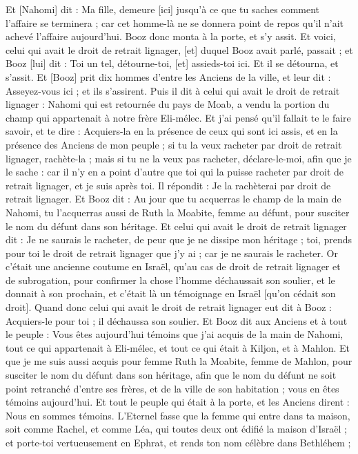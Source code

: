 \begin{multicols}{2}
Et [Nahomi] dit : Ma fille, demeure [ici] jusqu'à ce que tu saches comment l'affaire se terminera ; car cet homme-là ne se donnera point de repos qu'il n'ait achevé l'affaire aujourd'hui.
\VerseOne{}Booz donc monta à la porte, et s'y assit. Et voici, celui qui avait le droit de retrait lignager, [et] duquel Booz avait parlé, passait ; et Booz [lui] dit : Toi un tel, détourne-toi, [et] assieds-toi ici. Et il se détourna, et s'assit.
Et [Booz] prit dix hommes d'entre les Anciens de la ville, et leur dit : Asseyez-vous ici ; et ils s'assirent.
Puis il dit à celui qui avait le droit de retrait lignager : Nahomi qui est retournée du pays de Moab, a vendu la portion du champ qui appartenait à notre frère Eli-mélec.
Et j'ai pensé qu'il fallait te le faire savoir, et te dire : Acquiers-la en la présence de ceux qui sont ici assis, et en la présence des Anciens de mon peuple ; si tu la veux racheter par droit de retrait lignager, rachète-la ; mais si tu ne la veux pas racheter, déclare-le-moi, afin que je le sache : car il n'y en a point d'autre que toi qui la puisse racheter par droit de retrait lignager, et je suis après toi. Il répondit : Je la rachèterai par droit de retrait lignager.
Et Booz dit : Au jour que tu acquerras le champ de la main de Nahomi, tu l'acquerras aussi de Ruth la Moabite, femme au défunt, pour susciter le nom du défunt dans son héritage.
Et celui qui avait le droit de retrait lignager dit : Je ne saurais le racheter, de peur que je ne dissipe mon héritage ; toi, prends pour toi le droit de retrait lignager que j'y ai ; car je ne saurais le racheter.
Or c'était une ancienne coutume en Israël, qu'au cas de droit de retrait lignager et de subrogation, pour confirmer la chose l'homme déchaussait son soulier, et le donnait à son prochain, et c'était là un témoignage en Israël [qu'on cédait son droit].
Quand donc celui qui avait le droit de retrait lignager eut dit à Booz : Acquiers-le pour toi ; il déchaussa son soulier.
Et Booz dit aux Anciens et à tout le peuple : Vous êtes aujourd'hui témoins que j'ai acquis de la main de Nahomi, tout ce qui appartenait à Eli-mélec, et tout ce qui était à Kiljon, et à Mahlon.
Et que je me suis aussi acquis pour femme Ruth la Moabite, femme de Mahlon, pour susciter le nom du défunt dans son héritage, afin que le nom du défunt ne soit point retranché d'entre ses frères, et de la ville de son habitation ; vous en êtes témoins aujourd'hui.
Et tout le peuple qui était à la porte, et les Anciens dirent : Nous en sommes témoins. L'Eternel fasse que la femme qui entre dans ta maison, soit comme Rachel, et comme Léa, qui toutes deux ont édifié la maison d'Israël ; et porte-toi vertueusement en Ephrat, et rends ton nom célèbre dans Bethléhem ;

\end{multicols}
